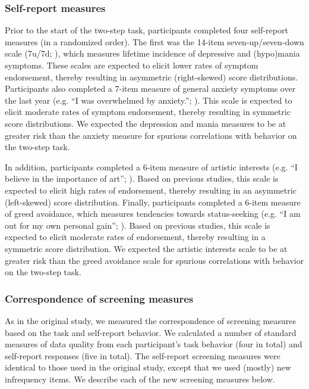 \documentclass[a4paper,notitlepage,12pt]{article}
\begin{document}
\begin{refsection}[supp]
\subsubsection*{Self-report measures}

Prior to the start of the two-step task, participants completed four self-report measures (in a randomized order). The first was the 14-item seven-up/seven-down scale (7u/7d; \cite{youngstrom_2013_susd-2}), which measures lifetime incidence of depressive and (hypo)mania symptoms. These scales are expected to elicit lower rates of symptom endorsement, thereby resulting in asymmetric (right-skewed) score distributions. Participants also completed a 7-item measure of general anxiety symptoms over the last year (e.g. ``I was overwhelmed by anxiety.''; \cite{watson2022development}). This scale is expected to elicit moderate rates of symptom endorsement, thereby resulting in symmetric score distributions. We expected the depression and mania measures to be at greater risk than the anxiety measure for spurious correlations with behavior on the two-step task. 

In addition, participants completed a 6-item measure of artistic interests (e.g. ``I believe in the importance of art''; \cite{ashton2007empirical}). Based on previous studies, this scale is expected to elicit high rates of endorsement, thereby resulting in an asymmetric (left-skewed) score distribution. Finally, participants completed a 6-item measure of greed avoidance, which measures tendencies towards status-seeking (e.g. ``I am out for my own personal gain''; \cite{ashton2007empirical}). Based on previous studies, this scale is expected to elicit moderate rates of endorsement, thereby resulting in a symmetric score distribution. We  expected the artistic interests scale to be at greater risk than the greed avoidance scale for spurious correlations with behavior on the two-step task. 

\subsubsection*{Correspondence of screening measures}

As in the original study, we measured the correspondence of screening measures based on the task and self-report behavior. We calculated a number of standard measures of data quality from each participant's task behavior (four in total) and self-report responses (five in total). The self-report screening measures were identical to those used in the original study, except that we used (mostly) new infrequency items. We describe each of the new screening measures below.


\end{refsection}
\end{document}
